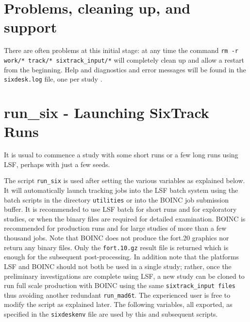 \documentclass{cernatsnote}    %
\begin{document}
\section{Problems, cleaning up, and support} 
There are often problems at this initial stage: at any time the command
{\tt rm -r work/* track/* sixtrack\_input/*} will completely clean up
and allow a restart from the beginning. Help 
and diagnostics and error messages will be found
in the {\tt sixdesk.log} file, one per study \footnotemark.

\section{run\_six - Launching SixTrack Runs}
%
\label{sec:run_six}
It is usual to commence a study with some short runs or a 
few long runs using LSF, perhaps with just a few seeds.

The script {\tt run\_six} is used after setting the various
variables as explained below.
It will automatically launch tracking jobs into the LSF batch
system using the batch scripts in the directory {\tt utilities}
or into the BOINC job submission buffer.
It is recommended to use LSF batch for short runs and for exploratory studies,
or when the binary files are required for detailed examination.
BOINC is recommended for production runs and for large studies of more than 
a few thousand jobs. Note that BOINC does not produce the fort.20 graphics nor
return any binary files. Only the {\tt fort.10.gz}  result file is returned which is
enough for the subsequent post-processing. 
In addition note that the platforms LSF and BOINC should
not both be used in a single study; rather, once the preliminary investigations
are complete using LSF, a new study can be cloned to run full scale
production with BOINC using the same {\tt sixtrack\_input files} thus
avoiding another redundant {\tt run\_mad6t}. 
The experienced user is free to modify the script as explained later.
The following variables, all exported, as specified in the {\tt sixdeskenv} file
are used by this and subsequent scripts.
\end{document}
